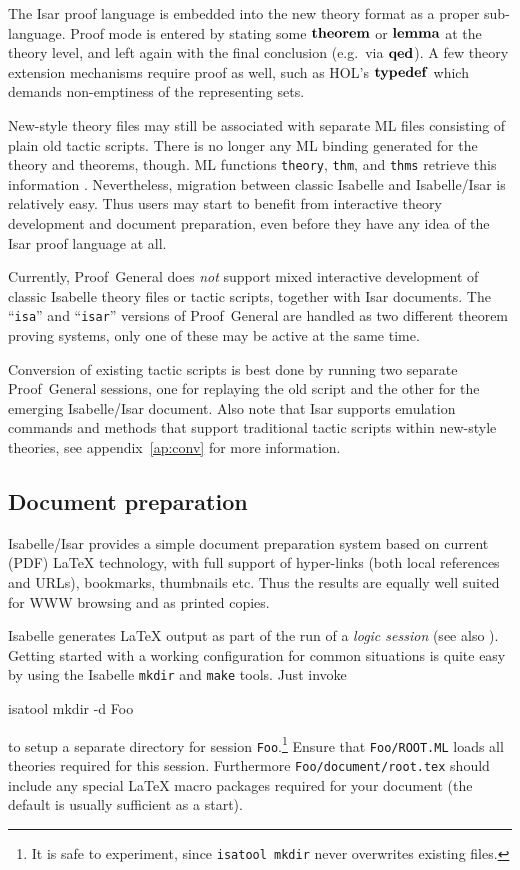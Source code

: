 The Isar proof language is embedded into the new theory format as a proper
sub-language.  Proof mode is entered by stating some ${\mathord{\mathbf{theorem}}}$ or
${\mathord{\mathbf{lemma}}}$ at the theory level, and left again with the final conclusion
(e.g.\ via ${\mathord{\mathbf{qed}}}$).  A few theory extension mechanisms require proof as
well, such as HOL's ${\mathord{\mathbf{typedef}}}$ which demands non-emptiness of the
representing sets.

New-style theory files may still be associated with separate ML files
consisting of plain old tactic scripts.  There is no longer any ML binding
generated for the theory and theorems, though.  ML functions \texttt{theory},
\texttt{thm}, and \texttt{thms} retrieve this information \cite{isabelle-ref}.
Nevertheless, migration between classic Isabelle and Isabelle/Isar is
relatively easy.  Thus users may start to benefit from interactive theory
development and document preparation, even before they have any idea of the
Isar proof language at all.

\begin{warn}
  Currently, Proof~General does \emph{not} support mixed interactive
  development of classic Isabelle theory files or tactic scripts, together
  with Isar documents.  The ``\texttt{isa}'' and ``\texttt{isar}'' versions of
  Proof~General are handled as two different theorem proving systems, only one
  of these may be active at the same time.
\end{warn}

Conversion of existing tactic scripts is best done by running two separate
Proof~General sessions, one for replaying the old script and the other for the
emerging Isabelle/Isar document.  Also note that Isar supports emulation
commands and methods that support traditional tactic scripts within new-style
theories, see appendix~\ref{ap:conv} for more information.


\subsection{Document preparation}\label{sec:document-prep}

Isabelle/Isar provides a simple document preparation system based on current
(PDF) {\LaTeX} technology, with full support of hyper-links (both local
references and URLs), bookmarks, thumbnails etc.  Thus the results are equally
well suited for WWW browsing and as printed copies.

\medskip

Isabelle generates {\LaTeX} output as part of the run of a \emph{logic
  session} (see also \cite{isabelle-sys}).  Getting started with a working
configuration for common situations is quite easy by using the Isabelle
\texttt{mkdir} and \texttt{make} tools.  Just invoke
\begin{ttbox}
  isatool mkdir -d Foo
\end{ttbox}
to setup a separate directory for session \texttt{Foo}.\footnote{It is safe to
  experiment, since \texttt{isatool mkdir} never overwrites existing files.}
Ensure that \texttt{Foo/ROOT.ML} loads all theories required for this session.
Furthermore \texttt{Foo/document/root.tex} should include any special {\LaTeX}
macro packages required for your document (the default is usually sufficient
as a start).

